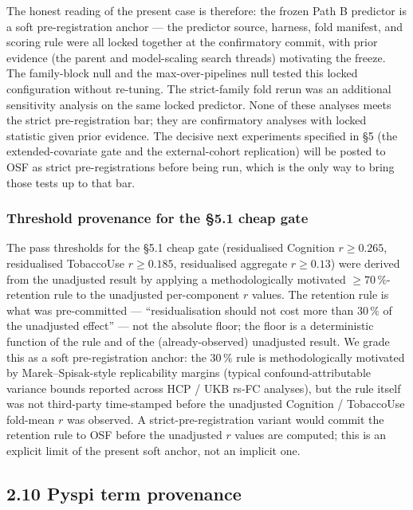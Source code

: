 \documentclass[11pt,letterpaper]{report}
\begin{document}
The honest reading of the present case is therefore: the frozen Path B predictor is a soft pre-registration anchor --- the predictor source, harness, fold manifest, and scoring rule were all locked together at the confirmatory commit, with prior evidence (the parent and model-scaling search threads) motivating the freeze. The family-block null and the max-over-pipelines null tested this locked configuration without re-tuning. The strict-family fold rerun was an additional sensitivity analysis on the same locked predictor. None of these analyses meets the strict pre-registration bar; they are confirmatory analyses with locked statistic given prior evidence. The decisive next experiments specified in \S5 (the extended-covariate gate and the external-cohort replication) will be posted to OSF as strict pre-registrations before being run, which is the only way to bring those tests up to that bar.

\subsubsection*{Threshold provenance for the \S5.1 cheap gate}

The pass thresholds for the \S5.1 cheap gate (residualised Cognition $r \ge 0.265$, residualised TobaccoUse $r \ge 0.185$, residualised aggregate $r \ge 0.13$) were derived from the unadjusted result by applying a methodologically motivated $\ge 70\,\%$-retention rule to the unadjusted per-component $r$ values. The retention rule is what was pre-committed --- ``residualisation should not cost more than $30\,\%$ of the unadjusted effect'' --- not the absolute floor; the floor is a deterministic function of the rule and of the (already-observed) unadjusted result. We grade this as a soft pre-registration anchor: the $30\,\%$ rule is methodologically motivated by Marek--Spisak-style replicability margins (typical confound-attributable variance bounds reported across HCP / UKB rs-FC analyses), but the rule itself was not third-party time-stamped before the unadjusted Cognition / TobaccoUse fold-mean $r$ was observed. A strict-pre-registration variant would commit the retention rule to OSF before the unadjusted $r$ values are computed; this is an explicit limit of the present soft anchor, not an implicit one.

\subsection*{2.10 Pyspi term provenance}
\end{document}
